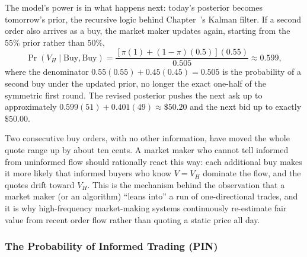 \documentclass[../ai_in_finance]{subfiles}
\begin{document}
The model's power is in what happens next: today's posterior becomes tomorrow's prior, the recursive logic behind Chapter~'s Kalman filter. If a second order also arrives as a buy, the market maker updates again, starting from the $55\%$ prior rather than $50\%$,
\begin{equation*}
\Pr(V_H \mid \text{Buy}, \text{Buy}) = \frac{[\pi(1)+(1-\pi)(0.5)](0.55)}{0.505} \approx 0.599,
\end{equation*}
where the denominator $0.55(0.55)+0.45(0.45)=0.505$ is the probability of a second buy under the updated prior, no longer the exact one-half of the symmetric first round. The revised posterior pushes the next ask up to approximately $0.599(51)+0.401(49) \approx \$50.20$ and the next bid up to exactly $\$50.00$.

Two consecutive buy orders, with no other information, have moved the whole quote range up by about ten cents. A market maker who cannot tell informed from uninformed flow should rationally react this way: each additional buy makes it more likely that informed buyers who know $V=V_H$ dominate the flow, and the quotes drift toward $V_H$. This is the mechanism behind the observation that a market maker (or an algorithm) ``leans into'' a run of one-directional trades, and it is why high-frequency market-making systems continuously re-estimate fair value from recent order flow rather than quoting a static price all day.

\subsubsection*{The Probability of Informed Trading (PIN)}
\end{document}
